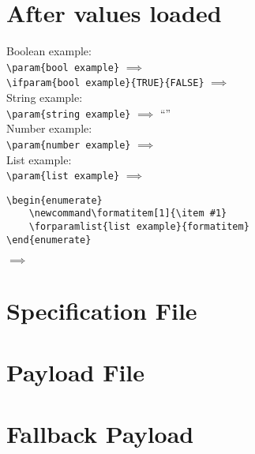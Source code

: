 \documentclass{article}
\begin{document}
        \section*{After values loaded}

        Boolean example:\\

        \lstinline|\param{bool example}|
        $\implies$
        \\

        \lstinline|\ifparam{bool example}{TRUE}{FALSE}|
        $\implies$
        \\

        String example:\\

        \lstinline|\param{string example}|
        $\implies$
        ``''\\

        Number example:\\

        \lstinline|\param{number example}|
        $\implies$
        \\

        List example:\\

        \lstinline|\param{list example}|
        $\implies$
        \\

        \begin{lstlisting}[language={[LaTeX]TeX},morekeywords={formatitem,forparamlist}]
\begin{enumerate}
    \newcommand\formatitem[1]{\item #1}
    \forparamlist{list example}{formatitem}
\end{enumerate}
        \end{lstlisting}
        $\implies$
        \begin{enumerate}
            \newcommand\formatitem[1]{\item #1}
        \end{enumerate}

    \section*{Specification File}
    


    \section*{Payload File}
    

    \section*{Fallback Payload}
    
\end{document}
